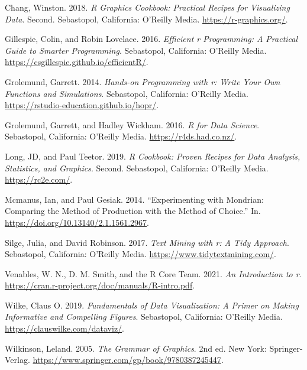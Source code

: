 \documentclass[
  letterpaper,
  DIV=11,
  numbers=noendperiod]{scrreprt}
\newlength{\cslhangindent}
\newenvironment{CSLReferences}[2] %
 {\begin{list}{}{%
  \setlength{\itemindent}{0pt}
  \setlength{\leftmargin}{0pt}
  \setlength{\parsep}{0pt}
  \ifodd #1
   \setlength{\leftmargin}{\cslhangindent}
   \setlength{\itemindent}{-1\cslhangindent}
  \fi
  \setlength{\itemsep}{#2\baselineskip}}}
 {\end{list}}
\begin{document}
\label{refs}
\begin{CSLReferences}{1}{0}
Chang, Winston. 2018. \emph{R Graphics Cookbook: Practical Recipes for
Visualizing Data}. Second. Sebastopol, California: O'Reilly Media.
\url{https://r-graphics.org/}.

Gillespie, Colin, and Robin Lovelace. 2016. \emph{Efficient r
Programming: A Practical Guide to Smarter Programming}. Sebastopol,
California: O'Reilly Media.
\url{https://csgillespie.github.io/efficientR/}.

Grolemund, Garrett. 2014. \emph{Hands-on Programming with r: Write Your
Own Functions and Simulations}. Sebastopol, California: O'Reilly Media.
\url{https://rstudio-education.github.io/hopr/}.

Grolemund, Garrett, and Hadley Wickham. 2016. \emph{R for Data Science}.
Sebastopol, California: O'Reilly Media. \url{https://r4ds.had.co.nz/}.

Long, JD, and Paul Teetor. 2019. \emph{R Cookbook: Proven Recipes for
Data Analysis, Statistics, and Graphics}. Second. Sebastopol,
California: O'Reilly Media. \url{https://rc2e.com/}.

Mcmanus, Ian, and Paul Gesiak. 2014. {``Experimenting with Mondrian:
Comparing the Method of Production with the Method of Choice.''} In.
\url{https://doi.org/10.13140/2.1.1561.2967}.

Silge, Julia, and David Robinson. 2017. \emph{Text Mining with r: A Tidy
Approach}. Sebastopol, California: O'Reilly Media.
\url{https://www.tidytextmining.com/}.

Venables, W. N., D. M. Smith, and the R Core Team. 2021. \emph{An
Introduction to r}.
\url{https://cran.r-project.org/doc/manuals/R-intro.pdf}.

Wilke, Claus O. 2019. \emph{Fundamentals of Data Visualization: A Primer
on Making Informative and Compelling Figures}. Sebastopol, California:
O'Reilly Media. \url{https://clauswilke.com/dataviz/}.

Wilkinson, Leland. 2005. \emph{The Grammar of Graphics}. 2nd ed. New
York: Springer-Verlag.
\url{https://www.springer.com/gp/book/9780387245447}.


\end{CSLReferences}
\end{document}
